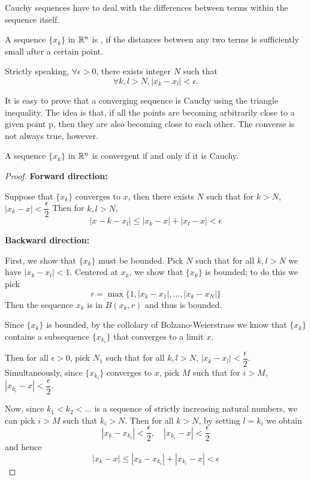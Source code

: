 Cauchy sequences have to deal with the differences between terms within the sequence itself.

\begin{definition}
A sequence $\{x_k\}$ in $\mathbb R^n$ is , if the distances between any two terms is sufficiently small after a certain point.

Strictly speaking, $\forall \epsilon>0$, there exists integer $N$ such that 
\[ \forall k,l>N, |x_k-x_l|<\epsilon. \]
\end{definition}

It is easy to prove that a converging sequence is Cauchy using the triangle inequality. The idea is that, if all the points are becoming arbitrarily close to a given point p, then they are also becoming close to each other. The converse is not always true, however.

\begin{proposition}
A sequence $\{x_k\}$ in $\mathbb R^n$ is convergent if and only if it is Cauchy.
\end{proposition}

\begin{proof}
\textbf{Forward direction:}

Suppose that $\{x_k\}$ converges to $x$, then there exists $N$ such that for $k>N$, $|x_k-x|<\dfrac{\epsilon}{2}$
Then for $k,l>N$, 
\[ |x-k-x_l| \le |x_k-x|+|x_l-x| < \epsilon \]

\textbf{Backward direction:}

First, we show that $\{x_k\}$ must be bounded. 
Pick $N$ such that for all $k,l>N$ we have $|x_k-x_l|<1$. 
Centered at $x_k$, we show that $\{x_k\}$ is bounded; to do this we pick
\[ r = \max\{1,|x_k-x_1|,\dots,|x_k-x_N|\} \]
Then the sequence ${x_k}$ is in $B(x_k,r)$ and thus is bounded.

Since $\{x_k\}$ is bounded, by the collolary of Bolzano-Weierstrass we know that $\{x_k\}$ contains a subsequence $\{x_{k_i}\}$ that converges to a limit $x$.

Then for all $\epsilon>0$, pick $N_1$ such that for all $k,l>N$, $|x_k-x_l|<\dfrac{\epsilon}{2}$. 
Simultaneously, since $\{x_{k_i}\}$ converges to $x$, pick $M$ such that for $i>M$, $|x_{k_i}-x|<\dfrac{\epsilon}{2}$.

Now, since $k_1<k_2<\dots$ is a sequence of strictly increasing natural numbers, we can pick $i>M$ such that $k_i>N$. Then for all $k>N$, by setting $l=k_i$ we obtain
\[ |x_k-x_{k_i}| < \frac{\epsilon}{2}, \quad |x_{k_i}-x| < \frac{\epsilon}{2} \]
and hence
\[ |x_k-x| \le |x_k-x_{k_i}|+|x_{k_i}-x| < \epsilon \]
\end{proof}


